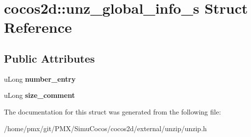\hypertarget{structcocos2d_1_1unz__global__info__s}{}\section{cocos2d\+:\+:unz\+\_\+global\+\_\+info\+\_\+s Struct Reference}
\label{structcocos2d_1_1unz__global__info__s}
\subsection*{Public Attributes}
\begin{DoxyCompactItemize}
\item 
\mbox{\label{structcocos2d_1_1unz__global__info__s_a4f2e5af8b3d5009a8131ec58bb1b76b2}} 
u\+Long {\bfseries number\+\_\+entry}
\item 
\mbox{\label{structcocos2d_1_1unz__global__info__s_ad2a9e02f7fd74c4e4718bfe3fdc01ef6}} 
u\+Long {\bfseries size\+\_\+comment}
\end{DoxyCompactItemize}


The documentation for this struct was generated from the following file\+:\begin{DoxyCompactItemize}
\item 
/home/pmx/git/\+P\+M\+X/\+Simu\+Cocos/cocos2d/external/unzip/unzip.\+h\end{DoxyCompactItemize}
